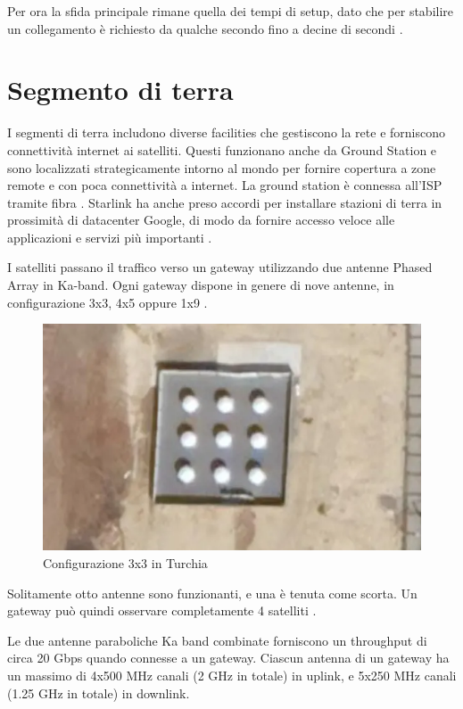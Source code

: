 Per ora la sfida principale rimane quella dei tempi di setup, dato che per stabilire un collegamento è richiesto da qualche secondo fino a decine di secondi \cite{chaudhry_laser_2021}.

\section{Segmento di terra}
I segmenti di terra includono diverse facilities che gestiscono la rete e forniscono connettività internet ai satelliti. Questi funzionano anche da Ground Station e sono localizzati strategicamente intorno al mondo per fornire copertura a zone remote e con poca connettività a internet.
La ground station è connessa all'\ac{ISP} tramite fibra \cite{branch_education_how_2022}.
Starlink ha anche preso accordi per installare stazioni di terra in prossimità di datacenter Google, di modo da fornire accesso veloce alle applicazioni e servizi più importanti \cite{jason_rainbow_starlink_2021}.

I satelliti passano il traffico verso un gateway utilizzando due antenne Phased Array in \ac{Ka}-band. Ogni gateway dispone in genere di nove antenne, in configurazione 3x3, 4x5 oppure 1x9 \cite{mike_puchol_modeling_2022}.

\begin{figure}[htbp]
  \centering
  \includegraphics[width=0.9\linewidth]{./res/img/starlink_gateway.png}
  \caption{Configurazione 3x3 in Turchia \cite{mike_puchol_modeling_2022}}
  \label{fig:starlink-gateway}
\end{figure}

Solitamente otto antenne sono funzionanti, e una è tenuta come scorta.
Un gateway può quindi osservare completamente 4 satelliti \cite{mike_puchol_modeling_2022}.

Le due antenne paraboliche \ac{Ka} band combinate forniscono un throughput di circa 20 Gbps quando connesse a un gateway.
Ciascun antenna di un gateway ha un massimo di 4x500 MHz canali (2 GHz in totale) in uplink, e 5x250 MHz canali (1.25 GHz in totale) in downlink.

